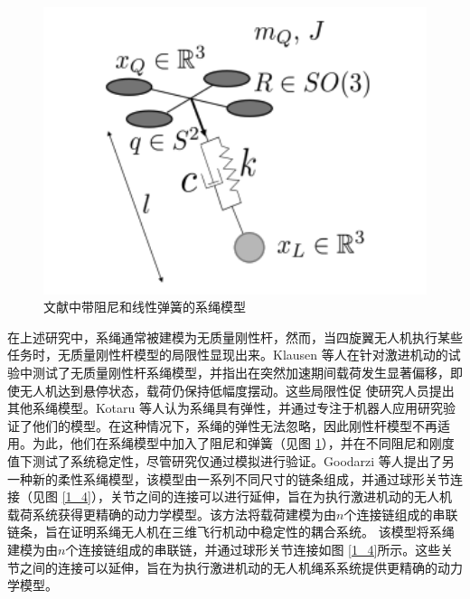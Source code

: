 \documentclass[lang=chs, degree=master, blindreview=true, winfonts=true]{yanputhesis}
\begin{document}
\begin{figure}[hbt!]
	\centering 
	\includegraphics[width=28pc]{picture/1_3.png} 
	\caption{文献中带阻尼和线性弹簧的系绳模型} \label{1_3}
\end{figure}
在上述研究中，系绳通常被建模为无质量刚性杆，然而，当四旋翼无人机执行某些任务时，无质量刚性杆模型的局限性显现出来\cite{castillo2019disturbance,estevez2021hybrid}。Klausen 等人\cite{klausen2017nonlinear}在针对激进机动的试验中测试了无质量刚性杆系绳模型，并指出在突然加速期间载荷发生显著偏移，即使无人机达到悬停状态，载荷仍保持低幅度摆动。这些局限性促 使研究人员提出其他系绳模型。Kotaru 等人\cite{kotaru2017dynamics}认为系绳具有弹性，并通过专注于机器人应用研究验证了他们的模型。在这种情况下，系绳的弹性无法忽略，因此刚性杆模型不再适用。为此，他们在系绳模型中加入了阻尼和弹簧（见图 \ref{1_3}），并在不同阻尼和刚度值下测试了系统稳定性，尽管研究仅通过模拟进行验证。Goodarzi 等人\cite{goodarzi2015geometric}提出了另一种新的柔性系绳模型，该模型由一系列不同尺寸的链条组成，并通过球形关节连接（见图 \ref{1_4}），关节之间的连接可以进行延伸，旨在为执行激进机动的无人机载荷系统获得更精确的动力学模型。该方法将载荷建模为由$n$个连接链组成的串联链条，旨在证明系绳无人机在三维飞行机动中稳定性的耦合系统。
该模型将系绳建模为由$n$个连接链组成的串联链，并通过球形关节连接如图 \ref{1_4}所示。这些关节之间的连接可以延伸，旨在为执行激进机动的无人机绳系系统提供更精确的动力学模型。
\end{document}
